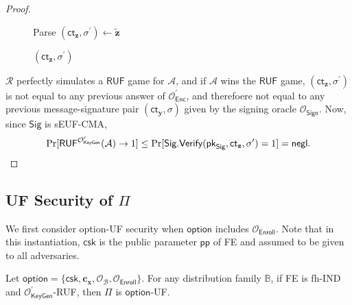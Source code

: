 \begin{proof}
\begin{figure}[h]
\begin{minipage}[t]{0.5\linewidth}
\begin{algorithm}[H]
\begin{algorithmic}[1]
		\State Parse $(\textsf{ct}_{\mathbf{z}}, \sigma^\prime) \gets \mathbf{\tilde{z}}$

		\State \Return $(\textsf{ct}_{\mathbf{z}}, \sigma^\prime)$
	\end{algorithmic}
	\end{algorithm}
	\end{minipage}
	
\end{figure}

$\mathcal{R}$ perfectly simulates a $\textsf{RUF}$ game for $\mathcal{A}$, and if $\mathcal{A}$ wins the $\textsf{RUF}$ game, $(\textsf{ct}_{\mathbf{z}}, \sigma^\prime)$ is not equal to any previous answer of $\mathcal{O}_{\textsf{Enc}}^\prime$, and therefoere not equal to any previous message-signature pair $(\textsf{ct}_{\mathbf{y}}, \sigma)$ given by the signing oracle $\mathcal{O}_{\textsf{Sign}}$. Now, since $\textsf{Sig}$ is sEUF-CMA,
\[
	\Pr[\textsf{RUF}^{ \mathcal{O}^\prime_{\textsf{KeyGen}}}(\mathcal{A}) \to 1] \leq \Pr[ \textsf{Sig.Verify}(\textsf{pk}_{\textsf{Sig}}, \textsf{ct}_{\mathbf{z}}, \sigma^\prime) = 1 ] = \mathsf{negl}.
\]


\end{proof}



\subsection{UF Security of $\Pi$}
\label{sec:security_analysis:fh-IPFE:uf}

We first consider \textsf{option}-UF security when $\textsf{option}$ includes $\mathcal{O}_\textsf{Enroll}$. Note that in this instantiation, $\textsf{csk}$ is the public parameter $\textsf{pp}$ of \textsf{FE} and assumed to be given to all adversaries. 

\begin{theorem}
\label{thm:fh-IPFE:ind-ruf-OB-Enroll}
	Let $\textsf{option} = \{ \textsf{csk}, \mathbf{c_x}, \mathcal{O}_\mathcal{B}, \mathcal{O}_{\textsf{Enroll}} \}$. For any distribution family $\mathbb{B}$, if \textsf{FE} is fh-IND and $\mathcal{O}^\prime_{\textsf{KeyGen}}$-RUF, then $\Pi$ is $\textsf{option}$-UF. 
\end{theorem}


